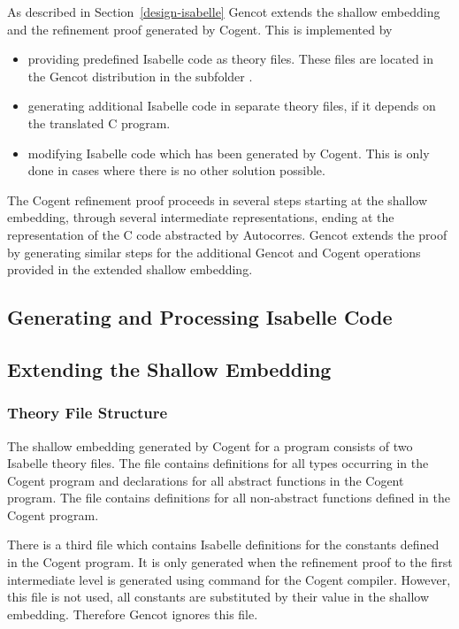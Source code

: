 As described in Section~\ref{design-isabelle} Gencot extends the shallow embedding and 
the refinement proof generated by Cogent. This is implemented by
\begin{itemize}
\item providing predefined Isabelle code as theory files. These files are located 
in the Gencot distribution in the subfolder .
\item generating additional Isabelle code in separate theory files, if it depends 
on the translated C program.
\item modifying Isabelle code which has been generated by Cogent. This is only done
in cases where there is no other solution possible.
\end{itemize}

The Cogent refinement proof proceeds in several steps starting at the shallow embedding, through several intermediate
representations, ending at the representation of the C code abstracted by Autocorres. Gencot extends the proof by
generating similar steps for the additional Gencot and Cogent operations provided in the extended shallow embedding.

\subsection{Generating and Processing Isabelle Code}
\label{impl-isabelle-code}

\subsection{Extending the Shallow Embedding}
\label{impl-isabelle-shallow}

\subsubsection{Theory File Structure}

The shallow embedding generated by Cogent for a program  consists of two Isabelle theory files. The file 
 contains definitions for all types occurring in the Cogent program and declarations
for all abstract functions in the Cogent program. The file  contains definitions 
for all non-abstract functions defined in the Cogent program.

There is a third file  which contains Isabelle definitions for the constants 
defined in the Cogent program. It is only generated when the refinement proof to the first intermediate level is generated
using command  for the Cogent compiler. However, this file is not used, all constants are 
substituted by their value in the shallow embedding. Therefore Gencot ignores this file.

